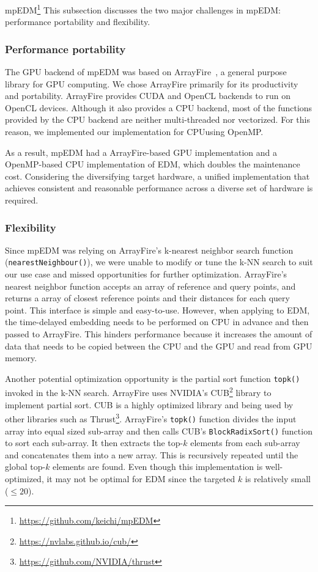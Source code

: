 \documentclass[sigconf]{acmart}
\begin{document}
mpEDM\footnote{\url{https://github.com/keichi/mpEDM}}
This subsection discusses the two major challenges in mpEDM: performance
portability and flexibility.

\subsubsection{Performance portability}\label{sec:portability}

The GPU backend of mpEDM was based on ArrayFire~\cite{Malcolm2012}, a general
purpose library for GPU computing. We chose ArrayFire primarily for its
productivity and portability. ArrayFire provides CUDA and OpenCL backends to
run on OpenCL devices. Although it also provides a CPU backend, most of the
functions provided by the CPU backend are neither multi-threaded nor
vectorized. For this reason, we implemented our implementation for CPU\@ using
OpenMP\@.

As a result, mpEDM had a ArrayFire-based GPU implementation and a OpenMP-based
CPU implementation of EDM, which doubles the maintenance cost. Considering the
diversifying target hardware, a unified implementation that achieves
consistent and reasonable performance across a diverse set of hardware is
required.

\subsubsection{Flexibility}\label{sec:flexibility}

Since mpEDM was relying on ArrayFire's k-nearest neighbor search function
(\texttt{nearestNeighbour()}), we were unable to modify or tune the k-NN
search to suit our use case and missed opportunities for further optimization.
ArrayFire's nearest neighbor function accepts an array of reference and query
points, and returns a array of closest reference points and their distances
for each query point. This interface is simple and easy-to-use. However, when
applying to EDM, the time-delayed embedding needs to be performed on CPU in
advance and then passed to ArrayFire. This hinders performance because it
increases the amount of data that needs to be copied between the CPU and the
GPU and read from GPU memory.

Another potential optimization opportunity is the partial sort function
\texttt{topk()} invoked in the k-NN search. ArrayFire uses NVIDIA's
CUB\footnote{\url{https://nvlabs.github.io/cub/}} library to implement partial
sort. CUB is a highly optimized library and being used by other libraries such
as Thrust\footnote{\url{https://github.com/NVIDIA/thrust}}. ArrayFire's
\texttt{topk()} function divides the input array into equal sized sub-array
and then calls CUB's \texttt{BlockRadixSort()} function to sort each
sub-array. It then extracts the top-$k$ elements from each sub-array and
concatenates them into a new array. This is recursively repeated until the
global top-$k$ elements are found. Even though this implementation is
well-optimized, it may not be optimal for EDM since the targeted $k$ is
relatively small ($\leq 20$).
\end{document}
